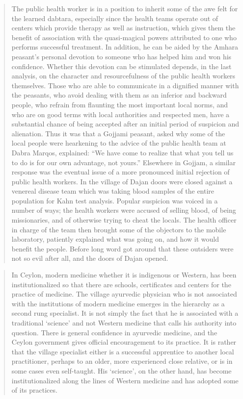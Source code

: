 \documentclass[
]{article}
\begin{document}
\begin{quote}
The public health worker is in a position to inherit some of the awe felt for the learned dabtara, especially since the health teams operate out of centers which provide therapy as well as instruction, which gives them the benefit of association with the quasi-magical powers attributed to one who performs successful treatment. In addition, he can be aided by the Amhara peasant's personal devotion to someone who has helped him and won his confidence. Whether this devotion can be stimulated depends, in the last analysis, on the character and resourcefulness of the public health workers themselves. Those who are able to communicate in a dignified manner with the peasants, who avoid dealing with them as an inferior and backward people, who refrain from flaunting the most important local norms, and who are on good terms with local authorities and respected men, have a substantial chance of being accepted after an initial period of suspicion and alienation. Thus it was that a Gojjami peasant, asked why some of the local people were hearkening to the advice of the public health team at Dabra Marqos, explained: ``We have come to realize that what you tell us to do is for our own advantage, not yours.'' Elsewhere in Gojjam, a similar response was the eventual issue of a more pronounced initial rejection of public health workers. In the village of Dajan doors were closed against a venereal disease team which was taking blood samples of the entire population for Kahn test analysis. Popular suspicion was voiced in a number of ways; the health workers were accused of selling blood, of being missionaries, and of otherwise trying to cheat the locals. The health officer in charge of the team then brought some of the objectors to the mobile laboratory, patiently explained what was going on, and how it would benefit the people. Before long word got around that these outsiders were not so evil after all, and the doors of Dajan opened.
\end{quote}

\begin{quote}
In Ceylon, modern medicine whether it is indigenous or Western, has been institutionalized so that there are schools, certificates and centers for the practice of medicine. The village ayurvedic physician who is not associated with the institutions of modern medicine emerges in the hierarchy as a second rung specialist. It is not simply the fact that he is associated with a traditional `science' and not Western medicine that calls his authority into question. There is general confidence in ayurvedic medicine, and the Ceylon government gives official encouragement to its practice. It is rather that the village specialist either is a successful apprentice to another local practitioner, perhaps to an older, more experienced close relative, or is in some cases even self-taught. His `science', on the other hand, has become institutionalized along the lines of Western medicine and has adopted some of its practices.
\end{quote}
\end{document}
